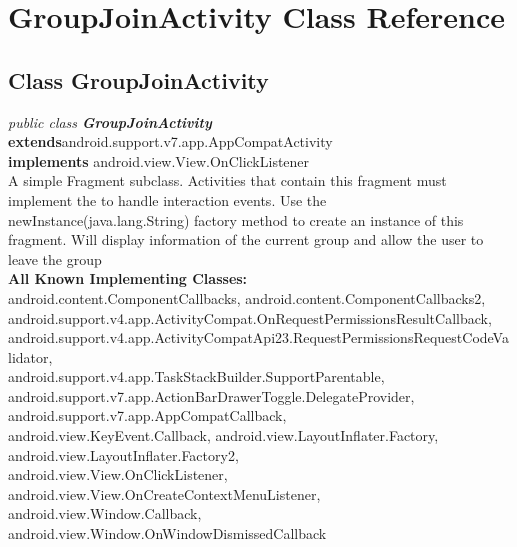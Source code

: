 \hypertarget{class_GroupJoinActivity.Android}{\section{GroupJoinActivity Class Reference}
\label{class_GroupJoinActivity.Android}
}

\subsection*{Class GroupJoinActivity}

\textit{public class \textbf{GroupJoinActivity}}\\
\tab \textbf{extends}android.support.v7.app.AppCompatActivity\\
\tab \textbf{implements } android.view.View.OnClickListener\\

A simple Fragment subclass. Activities that contain this fragment must implement the to handle interaction events. Use the newInstance(java.lang.String) factory method to create an instance of this fragment. Will display information of the current group and allow the user to leave the group\\


\textbf{All Known Implementing Classes:}\\
\tab            android.content.ComponentCallbacks, android.content.ComponentCallbacks2,\\
 android.support.v4.app.ActivityCompat.OnRequestPermissionsResultCallback, \\
 android.support.v4.app.ActivityCompatApi23.RequestPermissionsRequestCodeValidator,\\
 android.support.v4.app.TaskStackBuilder.SupportParentable, \\
 android.support.v7.app.ActionBarDrawerToggle.DelegateProvider, android.support.v7.app.AppCompatCallback, \\
 android.view.KeyEvent.Callback, android.view.LayoutInflater.Factory, android.view.LayoutInflater.Factory2, \\
 android.view.View.OnClickListener, android.view.View.OnCreateContextMenuListener,\\
  android.view.Window.Callback, android.view.Window.OnWindowDismissedCallback\\



